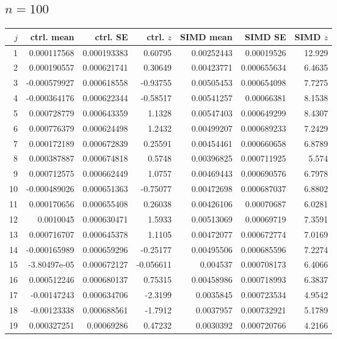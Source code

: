 \documentclass[10pt]{article}
\begin{document}
\subsection{$n=100$}
\begin{longtable}{rrrrrrr}
\toprule
$j$ & ctrl. mean & ctrl. SE & ctrl. $z$ & SIMD mean & SIMD SE & SIMD $z$\\
\midrule\endhead
1 & 0.000117568 & 0.000193383 & 0.60795 & 0.00252443 & 0.00019526 & 12.929 \\
2 & 0.000190557 & 0.000621741 & 0.30649 & 0.00423771 & 0.000655634 & 6.4635 \\
3 & -0.000579927 & 0.000618558 & -0.93755 & 0.00505453 & 0.000654098 & 7.7275 \\
4 & -0.000364176 & 0.000622344 & -0.58517 & 0.00541257 & 0.00066381 & 8.1538 \\
5 & 0.000728779 & 0.000643359 & 1.1328 & 0.00547403 & 0.000649299 & 8.4307 \\
6 & 0.000776379 & 0.000624498 & 1.2432 & 0.00499207 & 0.000689233 & 7.2429 \\
7 & 0.000172189 & 0.000672839 & 0.25591 & 0.00454461 & 0.000660658 & 6.8789 \\
8 & 0.000387887 & 0.000674818 & 0.5748 & 0.00396825 & 0.000711925 & 5.574 \\
9 & 0.000712575 & 0.000662449 & 1.0757 & 0.00469443 & 0.000690576 & 6.7978 \\
10 & -0.000489026 & 0.000651363 & -0.75077 & 0.00472698 & 0.000687037 & 6.8802 \\
11 & 0.000170656 & 0.000655408 & 0.26038 & 0.00426106 & 0.00070687 & 6.0281 \\
12 & 0.0010045 & 0.000630471 & 1.5933 & 0.00513069 & 0.00069719 & 7.3591 \\
13 & 0.000716707 & 0.000645378 & 1.1105 & 0.00472077 & 0.000672774 & 7.0169 \\
14 & -0.000165989 & 0.000659296 & -0.25177 & 0.00495506 & 0.000685596 & 7.2274 \\
15 & -3.80497e-05 & 0.000672127 & -0.056611 & 0.004537 & 0.000708173 & 6.4066 \\
16 & 0.000512246 & 0.000680137 & 0.75315 & 0.00458986 & 0.000718993 & 6.3837 \\
17 & -0.00147243 & 0.000634706 & -2.3199 & 0.0035845 & 0.000723534 & 4.9542 \\
18 & -0.00123338 & 0.000688561 & -1.7912 & 0.0037957 & 0.000732921 & 5.1789 \\
19 & 0.000327251 & 0.00069286 & 0.47232 & 0.0030392 & 0.000720766 & 4.2166 \\

\end{longtable}
\end{document}
